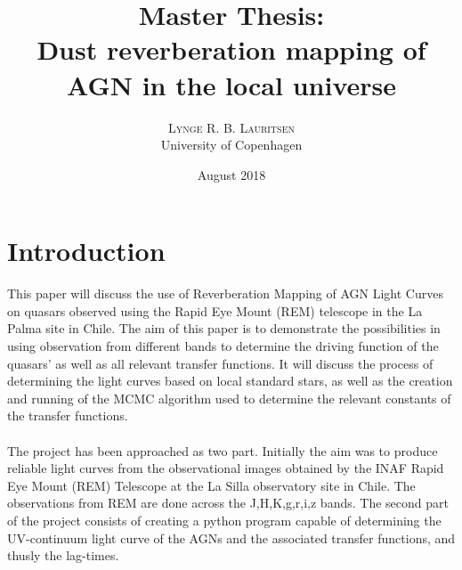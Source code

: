 \documentclass[a4paper, 12pt, twoside]{article}
\title{\vspace{15mm}\fontsize{30pt}{16pt}\selectfont\textbf{Master Thesis: \\Dust reverberation mapping of AGN in the local universe}\vspace{120mm}} %
\author{
\fontsize{24pt}{16pt}
\textsc{Lynge R. B. Lauritsen} \\
\normalsize University of Copenhagen \\ %
\date{August 2018}
\vspace{-9mm}
}
\begin{document}
\begin{titlepage}
\color{white}
\maketitle %
\clearpage
\end{titlepage}






\color{black}
\newpage
\tableofcontents
{}
\clearpage
\newpage
{}


\section{Introduction}
This paper will discuss the use of Reverberation Mapping of AGN Light Curves on quasars observed using the Rapid Eye Mount (REM) telescope in the La Palma site in Chile. The aim of this paper is to demonstrate the possibilities in using observation from different bands to determine the driving function of the quasars' as well as all relevant transfer functions. It will discuss the process of determining the light curves based on local standard stars, as well as the creation and running of the MCMC algorithm used to determine the relevant constants of the transfer functions.\\
\\
The project has been approached as two part. Initially the aim was to produce reliable light curves from the observational images obtained by the INAF Rapid Eye Mount (REM) Telescope at the La Silla observatory site in Chile. The observations from REM are done across the J,H,K,g,r,i,z bands. The second part of the project consists of creating a python program capable of determining the UV-continuum light curve of the AGNs and the associated transfer functions, and thusly the lag-times. \\
\end{document}
